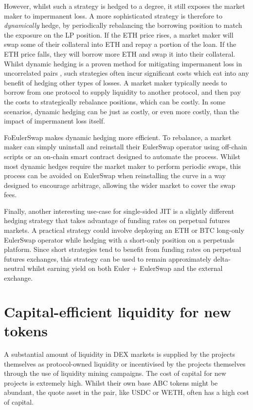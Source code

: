 \documentclass{article}
\begin{document}
However, whilst such a strategy is hedged to a degree, it still exposes the market maker to impermanent loss. A more sophisticated strategy is therefore to \textit{dynamically} hedge, by periodically rebalancing the borrowing position to match the exposure on the LP position. If the ETH price rises, a market maker will swap some of their collateral into ETH and repay a portion of the loan. If the ETH price falls, they will borrow more ETH and swap it into their collateral. Whilst dynamic hedging is a proven method for mitigating impermanent loss in uncorrelated pairs \cite{adams2021uniswapv3}, such strategies often incur significant costs which eat into any benefit of hedging other types of losses. A market maker typically needs to borrow from one protocol to supply liquidity to another protocol, and then pay the costs to strategically rebalance positions, which can be costly. In some scenarios, dynamic hedging can be just as costly, or even more costly, than the impact of impermanent loss itself.

FoEulerSwap makes dynamic hedging more efficient. To rebalance, a market maker can simply uninstall and reinstall their EulerSwap operator using off-chain scripts or an on-chain smart contract designed to automate the process. Whilst most dynamic hedges require the market maker to perform periodic swaps, this process can be avoided on EulerSwap when reinstalling the curve in a way designed to encourage arbitrage, allowing the wider market to cover the swap fees.

Finally, another interesting use-case for single-sided JIT is a slightly different hedging strategy that takes advantage of funding rates on perpetual futures markets. A practical strategy could involve deploying an ETH or BTC long-only EulerSwap operator while hedging with a short-only position on a perpetuals platform. Since short strategies tend to benefit from funding rates on perpetual futures exchanges, this strategy can be used to remain approximately delta-neutral whilst earning yield on both Euler + EulerSwap and the external exchange.

\section{Capital-efficient liquidity for new tokens}

A substantial amount of liquidity in DEX markets is supplied by the projects themselves as protocol-owned liquidity or incentivised by the projects themselves through the use of liquidity mining campaigns. The cost of capital for new projects is extremely high. Whilst their own base ABC tokens might be abundant, the quote asset in the pair, like USDC or WETH, often has a high cost of capital. 
\end{document}
